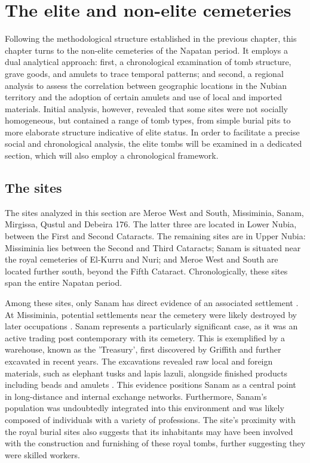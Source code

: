 \chapter{The elite and non-elite cemeteries}


Following the methodological structure established in the previous chapter, this chapter turns to the non-elite cemeteries of the Napatan period. It employs a dual analytical approach: first, a chronological examination of tomb structure, grave goods, and amulets to trace temporal patterns; and second, a regional analysis to assess the correlation between geographic locations in the Nubian territory and the adoption of certain amulets and use of local and imported materials.	Initial analysis, however, revealed that some sites were not socially homogeneous, but contained a range of tomb types, from simple burial pits to more elaborate structure indicative of elite status. In order to facilitate a precise social and chronological analysis, the elite tombs will be examined in a dedicated section, which will also employ a chronological framework.


\section{The sites}


The sites analyzed in this section are Meroe West and South, Missiminia, Sanam, Mirgissa, Qustul and Debeira 176. The latter three are located in Lower Nubia, between the First and Second Cataracts. The remaining sites are in Upper Nubia: Missiminia lies between the Second and Third Cataracts; Sanam is situated near the royal cemeteries of El-Kurru and Nuri; and Meroe West and South are located further south, beyond the Fifth Cataract. Chronologically, these sites span the entire Napatan period.


Among these sites, only Sanam has direct evidence of an associated settlement \parencites{tuckerDefiningCityNapatan2019}. At Missiminia, potential settlements near the cemetery were likely destroyed by later occupations \parencites[p.~15]{vilaNécropoleMissiminiaSépultures1980}. Sanam represents a particularly significant case, as it was an active trading post contemporary with its cemetery. This is exemplified by a warehouse, known as the 'Treasury', first discovered by Griffith and further excavated in recent years. The excavations revealed raw local and foreign materials, such as elephant tusks and lapis lazuli, alongside finished products including beads and amulets \parencites{griffithOxfordExcavationsNubia1922, vincentelliLongDistanceTrade2018}. This evidence positions Sanam as a central point in long-distance and internal exchange networks. Furthermore, Sanam's population was undoubtedly integrated into this environment and was likely composed of individuals with a variety of professions. The site's proximity with the royal burial sites also suggests that its inhabitants may have been involved with the construction and furnishing of these royal tombs, further suggesting they were skilled workers.


